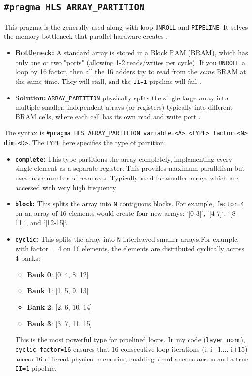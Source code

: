 \subsection{\texttt{\#pragma HLS ARRAY\_PARTITION}}
This pragma is the generally used along with loop \texttt{UNROLL} and \texttt{PIPELINE}. It solves the memory bottleneck that parallel hardware creates \cite{ref12}.
\begin{itemize}
    \item \textbf{Bottleneck:} A standard array is stored in a Block RAM (BRAM), which has only one or two "ports" (allowing 1-2 reads/writes per cycle). If you \texttt{UNROLL} a loop by 16 factor, then all the 16 adders  try to read from the \textit{same} BRAM at the same time. They will stall, and the \texttt{II=1} pipeline will fail \cite{ref13}.
    \item \textbf{Solution:} \texttt{ARRAY\_PARTITION} physically splits the single large array into multiple smaller, independent arrays (or registers) typically into different BRAM cells, where each cell has its own read and write port \cite{ref18, ref19}.
\end{itemize}
The syntax is \texttt{\#pragma HLS ARRAY\_PARTITION variable=<A> <TYPE> factor=<N> dim=<D>}. The \texttt{TYPE} here specifies the type of partition:
\begin{itemize}
    \item \textbf{\texttt{complete}:} This type partitions  the array completely, implementing every single element as a separate register. This provides maximum parallelism but uses more number of resources. Typically used for smaller arrays which are accessed with very high frequency
    \item \textbf{\texttt{block}:} This splits the array into \texttt{N} contiguous blocks. For example, \texttt{factor=4} on an array of 16 elements would create four new arrays: `[0-3]`, `[4-7]`, `[8-11]`, and `[12-15]`.
    \item \textbf{\texttt{cyclic}:} This splits the array into \texttt{N} interleaved smaller arrays.For example, with factor = 4 on 16 elements, the elements are distributed cyclically across 4 banks:
    \begin{itemize}
        \item \textbf{Bank 0}: [0, 4, 8, 12]
        \item \textbf{Bank 1}: [1, 5, 9, 13]
        \item \textbf{Bank 2}: [2, 6, 10, 14]
        \item \textbf{Bank 3}: [3, 7, 11, 15]
    \end{itemize}
    This is the most powerful type for pipelined loops. In my code (\texttt{layer\_norm}), \texttt{cyclic factor=16} ensures that 16 consecutive loop iterations (i, i+1,... i+15) access 16 different physical memories, enabling simultaneous access and a true \texttt{II=1} pipeline.
\end{itemize}

